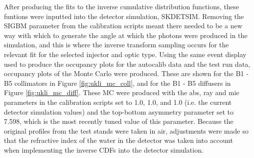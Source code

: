 \begin{figure}[!htbp]
    
\end{figure}

After producing the fits to the inverse cumulative distribution functions, these funtions were inputted into the detector simulation, SKDETSIM. Removing the SIGBM parameter from the calibration scripts meant there needed to be a new way with which to generate the angle at which the photons were produced in the simulation, and this is where the inverse transform sampling occurs for the relevant fit for the selected injector and optic type. Using the same event display used to produce the occupancy plots for the autocalib data and the test run data, occupancy plots of the Monte Carlo were produced. These are shown for the B1 - B5 collimators in Figure \ref{fig:ukli_mc_coll}, and for the B1 - B5 diffusers in Figure \ref{fig:ukli_mc_diff}. These MC were produced with the abs, ray and mie parameters in the calibration scripts set to 1.0, 1.0, and 1.0 (i.e. the current detector simulation values) and the top-bottom asymmetry parameter set to 7.598, which is the most recently tuned value of this parameter. Because the original profiles from the test stands were taken in air, adjustments were made so that the refractive index of the water in the detector was taken into account when implementing the inverse CDFs into the detector simulation. 

